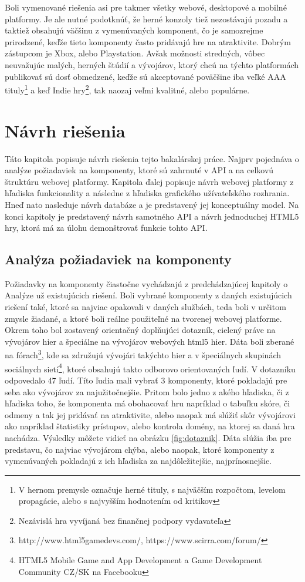 Boli vymenované riešenia asi pre takmer všetky webové, desktopové a mobilné platformy. Je ale nutné podotknúť, že herné konzoly tiež nezostávajú pozadu a taktiež obsahujú väčšinu z vymenúvaných komponent, čo je samozrejme prirodzené, keďže tieto komponenty často pridávajú hre na atraktivite. Dobrým zástupcom je Xbox, alebo Playstation. Avšak možnosti stredných, vôbec neuvažujúc malých, herných štúdií a vývojárov, ktorý chcú na týchto platformách publikovať sú dosť obmedzené, keďže sú akceptované poväčšine iba veľké AAA tituly\footnote{V hernom premysle označuje herné tituly, s najväčším rozpočtom, levelom propagácie, alebo s najvyšším hodnotením od kritikov} a keď Indie hry\footnote{Nezávislá hra vyvíjaná bez finančnej podpory vydavateľa}, tak naozaj veľmi kvalitné, alebo populárne.

\chapter{Návrh riešenia}
\label{chap:navrh}
Táto kapitola popisuje návrh riešenia tejto bakalárskej práce. Najprv pojednáva o analýze požiadaviek na komponenty, ktoré sú zahrnuté v API a na celkovú štruktúru webovej platformy. Kapitola ďalej popisuje návrh webovej platformy z hľadiska funkcionality a následne z hľadiska grafického užívateľského rozhrania. Hneď nato nasleduje návrh databáze a je predstavený jej konceptuálny model. Na konci kapitoly je predstavený návrh samotného API a návrh jednoduchej HTML5 hry, ktorá má za úlohu demonštrovať funkcie tohto API.  

\section{Analýza požiadaviek na komponenty}
Požiadavky na komponenty čiastočne vychádzajú z predchádzajúcej kapitoly o Analýze už existujúcich riešení. Boli vybrané komponenty z daných existujúcich riešení také, ktoré sa najviac opakovali v daných službách, teda boli v určitom zmysle žiadané, a ktoré boli reálne použiteľné na tvorenej webovej platforme. Okrem toho bol zostavený orientačný doplňujúci dotazník, cielený práve na vývojárov hier a špeciálne na vývojárov webových html5 hier. Dáta boli zberané na fórach\footnote{http://www.html5gamedevs.com/, https://www.scirra.com/forum/}, kde sa združujú vývojári takýchto hier a v špeciálnych skupinách sociálnych sietí\footnote{HTML5 Mobile Game and App Development a Game Development Community CZ/SK na Facebooku}, ktoré obsahujú takto odborovo orientovaných ľudí. V dotazníku odpovedalo 47 ľudí. Títo ľudia mali vybrať 3 komponenty, ktoré pokladajú pre seba ako vývojárov za najužitočnejšie. Pritom bolo jedno z akého hľadiska, či z hľadiska toho, že komponenta má obohacovať hru napríklad o tabuľku skóre, či odmeny a tak jej pridávať na atraktivite, alebo naopak má slúžiť skôr vývojárovi ako napríklad štatistiky prístupov, alebo kontrola domény, na ktorej sa daná hra nachádza. Výsledky môžete vidieť na obrázku \ref{fig:dotaznik}. Dáta slúžia iba pre predstavu, čo najviac vývojárom chýba, alebo naopak, ktoré komponenty z vymenúvaných pokladajú z ich hľadiska za najdôležitejšie, najprínosnejšie.  

